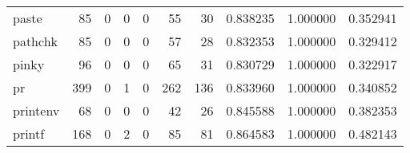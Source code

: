 \begin{longtable}{lrrrrrrrrr}
paste     &                                    85 &                                                  0 &                                                  0 &                                                  0 &                                                 55 &                                                 30 &                                           0.838235 &                               1.000000 &                             0.352941 \\
pathchk   &                                    85 &                                                  0 &                                                  0 &                                                  0 &                                                 57 &                                                 28 &                                           0.832353 &                               1.000000 &                             0.329412 \\
pinky     &                                    96 &                                                  0 &                                                  0 &                                                  0 &                                                 65 &                                                 31 &                                           0.830729 &                               1.000000 &                             0.322917 \\
pr        &                                   399 &                                                  0 &                                                  1 &                                                  0 &                                                262 &                                                136 &                                           0.833960 &                               1.000000 &                             0.340852 \\
printenv  &                                    68 &                                                  0 &                                                  0 &                                                  0 &                                                 42 &                                                 26 &                                           0.845588 &                               1.000000 &                             0.382353 \\
printf    &                                   168 &                                                  0 &                                                  2 &                                                  0 &                                                 85 &                                                 81 &                                           0.864583 &                               1.000000 &                             0.482143 \\

\end{longtable}
